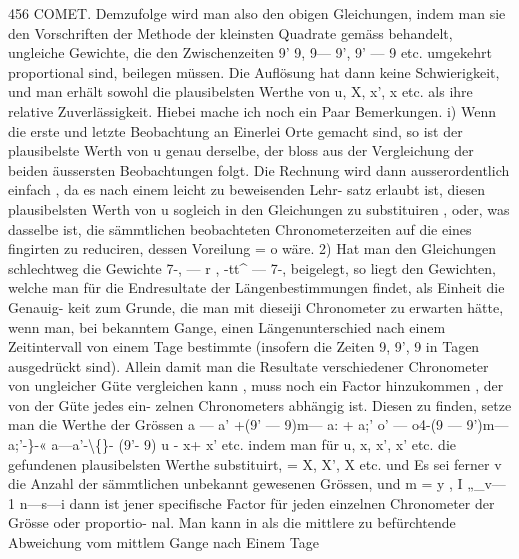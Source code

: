 \documentclass[10pt,a4paper]{article}
\begin{document}
456  COMET.
Demzufolge  wird  man  also  den  obigen  Gleichungen,  indem  man  sie  den  Vorschriften  der
Methode  der  kleinsten  Quadrate  gemäss  behandelt,  ungleiche  Gewichte,  die  den  Zwischenzeiten
9'  9,  9\glqq{}--- 9',  9'\glqq{} --- 9\glqq{}  etc.    umgekehrt  proportional  sind,  beilegen  müssen.
Die  Auflösung  hat  dann  keine  Schwierigkeit,  und  man  erhält  sowohl  die  plausibelsten  Werthe
von   u,  X,  x',  x\glqq{}  etc.    als  ihre  relative  Zuverlässigkeit.     Hiebei  mache  ich  noch  ein  Paar  Bemerkungen.
i)  Wenn  die  erste  und  letzte  Beobachtung  an  Einerlei  Orte  gemacht  sind,  so  ist  der  plausibelste
Werth  von  u  genau  derselbe,  der  bloss  aus  der  Vergleichung  der  beiden  äussersten  Beobachtungen
folgt.  Die  Rechnung  wird  dann  ausserordentlich  einfach ,  da  es  nach  einem  leicht  zu  beweisenden  Lehr-
satz erlaubt  ist,  diesen  plausibelsten  Werth  von  u  sogleich  in  den  Gleichungen  zu  substituiren ,  oder,
was  dasselbe  ist,  die  sämmtlichen  beobachteten  Chronometerzeiten  auf  die  eines  fingirten  zu  reduciren,
dessen  Voreilung    =  o   wäre.
2)  Hat  man  den  Gleichungen  schlechtweg  die  Gewichte  7-, --- r  ,  -tt\textasciicircum{} --- 7-,  beigelegt,  so  liegt  den
Gewichten,  welche  man  für  die  Endresultate  der  Längenbestimmungen  findet,  als  Einheit  die  Genauig-
keit zum  Grunde,  die  man  mit  dieseiji  Chronometer  zu  erwarten  hätte,  wenn  man,  bei  bekanntem  Gange,
einen  Längenunterschied  nach  einem  Zeitintervall  von  einem  Tage  bestimmte  (insofern  die  Zeiten
9,  9',  9\glqq{}  in  Tagen  ausgedrückt  sind).  Allein  damit  man  die  Resultate  verschiedener  Chronometer  von
ungleicher  Güte  vergleichen  kann ,  muss  noch  ein  Factor  hinzukommen ,  der  von  der  Güte  jedes  ein-
zelnen Chronometers  abhängig  ist.     Diesen  zu  finden,  setze  man  die  Werthe  der  Grössen
a  --- a'  +(9'  ---  9)m---  a:  +  a;'
o'  --- o\glqq{}4-(9\glqq{}  --- 9')m--- a;'-\}-«\glqq{}
a\glqq{}---a\glqq{}'-\textbackslash\{\}-  (9'\glqq{}-  9\glqq{})  u  -  x\glqq{}+  x'\glqq{}  etc.
indem  man  für   u,  x,  x',  x'  etc.    die  gefundenen  plausibelsten  Werthe  substituirt,    =  X,  X',  X\glqq{}  etc.  und
Es  sei  ferner  v  die  Anzahl  der  sämmtlichen  unbekannt  gewesenen  Grössen,  und  m  =  y  ,
I               „\_v--- 1    n---s---i
dann  ist  jener  specifische  Factor  für  jeden  einzelnen  Chronometer  der  Grösse     oder      proportio-
nal.   Man  kann  in  als  die  mittlere  zu  befürchtende  Abweichung  vom  mittlem  Gange  nach  Einem  Tage
\end{document}
